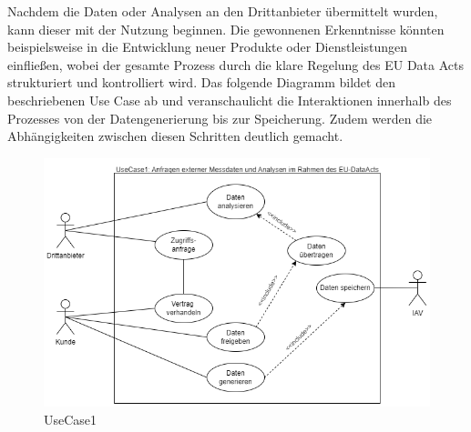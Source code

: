   \newline
  Nachdem die Daten oder Analysen an den Drittanbieter übermittelt wurden, kann dieser mit der Nutzung beginnen. Die gewonnenen Erkenntnisse könnten beispielsweise in die Entwicklung neuer Produkte oder Dienstleistungen einfließen, wobei der gesamte Prozess durch die klare Regelung des EU Data Acts strukturiert und kontrolliert wird.
  \newline
  Das folgende Diagramm bildet den beschriebenen Use Case ab und veranschaulicht die Interaktionen innerhalb des Prozesses von der Datengenerierung bis zur Speicherung. Zudem werden die Abhängigkeiten zwischen diesen Schritten deutlich gemacht.
  \begin{figure}[H]
      \centering
      \includegraphics[scale=.6]{media/UseCase1}
      \caption{UseCase1}
      \label{fig:UseCase1}
  \end{figure}
\newpage
